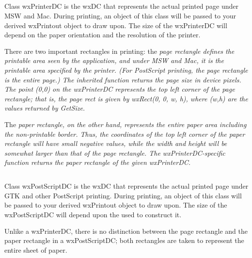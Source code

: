 \subsection{}

Class wxPrinterDC is the wxDC that represents the actual printed page under MSW
and Mac. During printing, an object of this class will be passed to your derived
wxPrintout object to draw upon. The size of the wxPrinterDC will depend on the
paper orientation and the resolution of the printer.

There are two important rectangles in printing: the \em{page rectangle} defines
the printable area seen by the application, and under MSW and Mac, it is the
printable area specified by the printer. (For PostScript printing, the page
rectangle is the entire page.) The inherited function
 returns the page size in device pixels. The
point (0,0) on the wxPrinterDC represents the top left corner of the page
rectangle; that is, the page rect is given by wxRect(0, 0, w, h), where (w,h)
are the values returned by GetSize.

The \em{paper rectangle}, on the other hand, represents the entire paper area
including the non-printable border. Thus, the coordinates of the top left corner
of the paper rectangle will have small negative values, while the width and
height will be somewhat larger than that of the page rectangle. The
wxPrinterDC-specific function
 returns the paper
rectangle of the given wxPrinterDC.

\subsection{}

Class wxPostScriptDC is the wxDC that represents the actual printed page under
GTK and other PostScript printing. During printing, an object of this class will
be passed to your derived wxPrintout object to draw upon. The size of the
wxPostScriptDC will depend upon the  used to
construct it.

Unlike a wxPrinterDC, there is no distinction between the page rectangle and the
paper rectangle in a wxPostScriptDC; both rectangles are taken to represent the
entire sheet of paper.

\subsection{}

